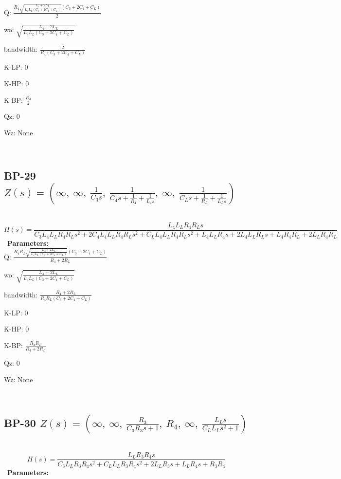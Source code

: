 \documentclass{article}
\begin{document}
Q: $\frac{R_{4} \sqrt{\frac{L_{4} + 2 L_{L}}{L_{4} L_{L} \left(C_{3} + 2 C_{4} + C_{L}\right)}} \left(C_{3} + 2 C_{4} + C_{L}\right)}{2}$\ 

wo: $\sqrt{\frac{L_{4} + 2 L_{L}}{L_{4} L_{L} \left(C_{3} + 2 C_{4} + C_{L}\right)}}$\ 

bandwidth: $\frac{2}{R_{4} \left(C_{3} + 2 C_{4} + C_{L}\right)}$\ 

K-LP: $0$\ 

K-HP: $0$\ 

K-BP: $\frac{R_{4}}{2}$\ 

Qz: $0$\ 

Wz: $\text{None}$\ 

\ 

\subsection{BP-29 $Z(s) = \left( \infty, \  \infty, \  \frac{1}{C_{3} s}, \  \frac{1}{C_{4} s + \frac{1}{R_{4}} + \frac{1}{L_{4} s}}, \  \infty, \  \frac{1}{C_{L} s + \frac{1}{R_{L}} + \frac{1}{L_{L} s}}\right)$ } \ 
\textbf{\[H(s) = \frac{L_{4} L_{L} R_{4} R_{L} s}{C_{3} L_{4} L_{L} R_{4} R_{L} s^{2} + 2 C_{4} L_{4} L_{L} R_{4} R_{L} s^{2} + C_{L} L_{4} L_{L} R_{4} R_{L} s^{2} + L_{4} L_{L} R_{4} s + 2 L_{4} L_{L} R_{L} s + L_{4} R_{4} R_{L} + 2 L_{L} R_{4} R_{L}}\] } \ 
\textbf{Parameters:}\\ 

Q: $\frac{R_{4} R_{L} \sqrt{\frac{L_{4} + 2 L_{L}}{L_{4} L_{L} \left(C_{3} + 2 C_{4} + C_{L}\right)}} \left(C_{3} + 2 C_{4} + C_{L}\right)}{R_{4} + 2 R_{L}}$\ 

wo: $\sqrt{\frac{L_{4} + 2 L_{L}}{L_{4} L_{L} \left(C_{3} + 2 C_{4} + C_{L}\right)}}$\ 

bandwidth: $\frac{R_{4} + 2 R_{L}}{R_{4} R_{L} \left(C_{3} + 2 C_{4} + C_{L}\right)}$\ 

K-LP: $0$\ 

K-HP: $0$\ 

K-BP: $\frac{R_{4} R_{L}}{R_{4} + 2 R_{L}}$\ 

Qz: $0$\ 

Wz: $\text{None}$\ 

\ 

\subsection{BP-30 $Z(s) = \left( \infty, \  \infty, \  \frac{R_{3}}{C_{3} R_{3} s + 1}, \  R_{4}, \  \infty, \  \frac{L_{L} s}{C_{L} L_{L} s^{2} + 1}\right)$ } \ 
\textbf{\[H(s) = \frac{L_{L} R_{3} R_{4} s}{C_{3} L_{L} R_{3} R_{4} s^{2} + C_{L} L_{L} R_{3} R_{4} s^{2} + 2 L_{L} R_{3} s + L_{L} R_{4} s + R_{3} R_{4}}\] } \ 
\textbf{Parameters:}\\ 
\end{document}
